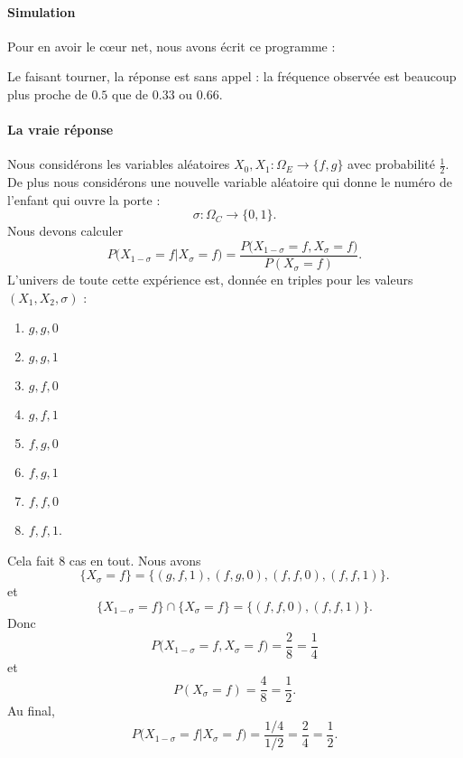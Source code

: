 \paragraph{Simulation}

Pour en avoir le cœur net, nous avons écrit ce programme :


Le faisant tourner, la réponse est sans appel : la fréquence observée est beaucoup plus proche de \( 0.5\) que de \( 0.33\) ou \( 0.66\).

\paragraph{La vraie réponse}

Nous considérons les variables aléatoires \( X_0,X_1\colon \Omega_E\to \{ f,g \}\) avec probabilité \( \frac{ 1 }{2}\). De plus nous considérons une nouvelle variable aléatoire qui donne le numéro de l'enfant qui ouvre la porte :
\begin{equation}
    \sigma\colon \Omega_C\to \{ 0,1 \}.
\end{equation}
Nous devons calculer
\begin{equation}
    P\big( X_{1-\sigma}=f|X_{\sigma}=f \big)=\frac{ P\big( X_{1-\sigma}=f,X_{\sigma}=f \big) }{ P(X_{\sigma}=f) }.
\end{equation}
L'univers de toute cette expérience est, donnée en triples pour les valeurs \( (X_1,X_2,\sigma)\) :
\begin{multicols}{4}
    \begin{enumerate}
        \item
            \( g,g,0\)
        \item
            \( g,g,1\)
        \item
            \( g,f,0\)
        \item
            \( g,f,1\)
        \item
            \( f,g,0\)
        \item
            \( f,g,1\)
        \item
            \( f,f,0\)
        \item
            \( f,f,1\).
    \end{enumerate}
\end{multicols}
Cela fait \( 8\) cas en tout. Nous avons
\begin{equation}
    \{ X_{\sigma}=f \}=\{ (g,f,1),(f,g,0),(f,f,0),(f,f,1) \}.
\end{equation}
et
\begin{equation}
    \{ X_{1-\sigma}=f \}\cap\{ X_{\sigma}=f \}=\{ (f,f,0),(f,f,1) \}.
\end{equation}
Donc
\begin{equation}
    P\big( X_{1-\sigma}=f,X_{\sigma}=f \big)=\frac{ 2 }{ 8 }=\frac{1}{ 4 }
\end{equation}
et
\begin{equation}
    P(X_{\sigma}=f)=\frac{ 4 }{ 8 }=\frac{ 1 }{2}.
\end{equation}
Au final,
\begin{equation}
    P\big( X_{1-\sigma}=f|X_{\sigma}=f \big)=\frac{ 1/4 }{ 1/2 }=\frac{ 2 }{ 4 }=\frac{ 1 }{2}.
\end{equation}

